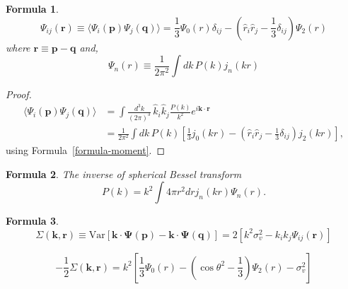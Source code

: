 \documentclass[a4paper,11pt]{article}
\newtheorem{formula}{Formula}[section]
\begin{document}
%
%
\begin{formula}
  \begin{equation}
    \Psi_{ij} (\bm{r}) \equiv \langle \Psi_i(\bm{p}) \Psi_j(\bm{q}) \rangle =
    \frac{1}{3} \Psi_0(r) \delta_{ij} - \left( \hat{r}_i \hat{r}_j - \frac{1}{3} \delta_{ij} \right) \Psi_2(r)
  \end{equation}
  where $\bm{r} \equiv \bm{p} - \bm{q}$ and,
  \begin{equation}
    \Psi_n(r) \equiv \frac{1}{2\pi^2} \int \! dk \, P(k) j_n(kr)
  \end{equation}
\end{formula}

\begin{proof}
  \begin{equation}
    \begin{split}
      \langle \Psi_i(\bm{p}) \Psi_j(\bm{q}) \rangle &=
      \int \! \frac{d^3 k}{(2\pi)^3} \,
        \hat{k}_i \hat{k}_j \frac{P(k)}{k^2} e^{i\bm{k}\cdot\bm{r}}\\
      &= \frac{1}{2\pi^2} \int\! dk \, P(k) \left[
         \frac{1}{3} j_0(kr) - \left( \hat{r}_i \hat{r}_j - \frac{1}{3}\delta_{ij} \right) j_2(kr) \right],
    \end{split}
  \end{equation}
  using Formula~\ref{formula-moment}.
\end{proof}

\begin{formula}
  \label{formula:inverse-bessel}
  The inverse of spherical Bessel transform
  \begin{equation}
    P(k) = k^2 \int 4\pi r^2 dr j_n(kr) \Psi_n(r).
  \end{equation}
\end{formula}

\begin{formula}
  \begin{equation}
    \Sigma(\bm{k}, \bm{r}) \equiv \mathrm{Var} \left[
      \bm{k} \cdot \bm{\Psi}(\bm{p}) - \bm{k} \cdot \bm{\Psi}(\bm{q}) \right]
    = 2\left[ k^2 \sigma_v^2 - k_i k_j \Psi_{ij}(\bm{r}) \right]
  \end{equation}

  \begin{equation}
    -\frac{1}{2} \Sigma(\bm{k}, \bm{r}) = 
      k^2 \left[ \frac{1}{3} \Psi_0(r) -
               \left( \cos\theta^2 - \frac{1}{3} \right) \Psi_2(r) - \sigma_v^2
          \right]
  \end{equation}
\end{formula}
\end{document}
